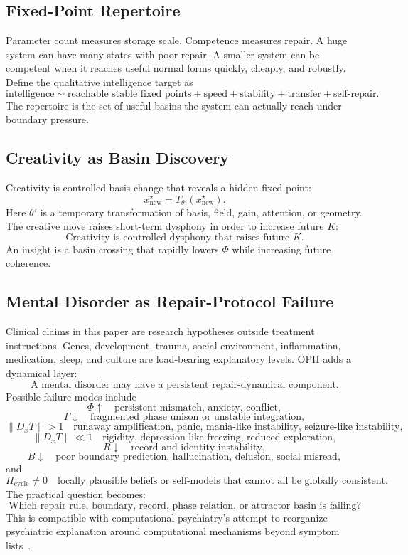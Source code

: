 \documentclass[11pt]{article}
\theoremstyle{remark}
\theoremstyle{plain}
\begin{document}
\subsection{Fixed-Point Repertoire}

Parameter count measures storage scale. Competence measures repair. A huge system can have many states with poor repair. A smaller system can be competent when it reaches useful normal forms quickly, cheaply, and robustly. Define the qualitative intelligence target as
\[
\boxed{
\text{intelligence}
\sim
\text{reachable stable fixed points}
+
\text{speed}
+
\text{stability}
+
\text{transfer}
+
\text{self-repair}.
}
\]
The repertoire is the set of useful basins the system can actually reach under boundary pressure.

\subsection{Creativity as Basin Discovery}

Creativity is controlled basis change that reveals a hidden fixed point:
\[
x^\star_{\mathrm{new}}
=
T_{\theta'}(x^\star_{\mathrm{new}}).
\]
Here \(\theta'\) is a temporary transformation of basis, field, gain, attention, or geometry. The creative move raises short-term dysphony in order to increase future \(K\):
\[
\boxed{
\text{Creativity is controlled dysphony that raises future }K.
}
\]
An insight is a basin crossing that rapidly lowers \(\Phi\) while increasing
future coherence.

\subsection{Mental Disorder as Repair-Protocol Failure}

Clinical claims in this paper are research hypotheses outside treatment instructions. Genes, development, trauma, social environment, inflammation, medication, sleep, and culture are load-bearing explanatory levels. OPH adds a dynamical layer:
\[
\boxed{
\text{A mental disorder may have a persistent repair-dynamical component.}
}
\]
Possible failure modes include
\[
\Phi\uparrow
\quad\text{persistent mismatch, anxiety, conflict},
\]
\[
\Gamma\downarrow
\quad\text{fragmented phase unison or unstable integration},
\]
\[
\|D_xT\|>1
\quad\text{runaway amplification, panic, mania-like instability, seizure-like instability},
\]
\[
\|D_xT\|\ll1
\quad\text{rigidity, depression-like freezing, reduced exploration},
\]
\[
R\downarrow
\quad\text{record and identity instability},
\]
\[
B\downarrow
\quad\text{poor boundary prediction, hallucination, delusion, social misread},
\]
and
\[
H_{\mathrm{cycle}}\ne0
\quad\text{locally plausible beliefs or self-models that cannot all be globally consistent}.
\]
The practical question becomes:
\[
\boxed{
\text{Which repair rule, boundary, record, phase relation, or attractor basin is failing?}
}
\]
This is compatible with computational psychiatry's attempt to reorganize psychiatric explanation around computational mechanisms beyond symptom lists~\cite{ComputationalPsychiatryDisorder2024,Friston2023}.
\end{document}
